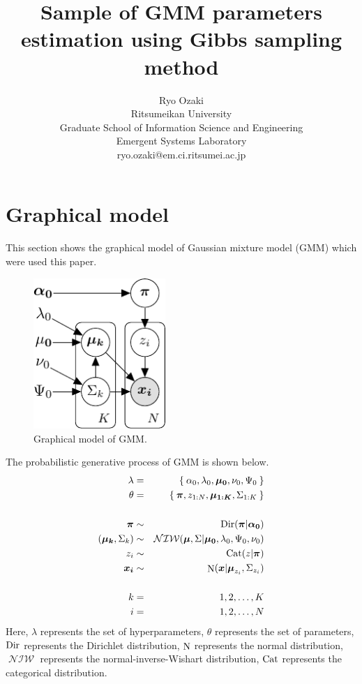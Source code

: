 \documentclass[a4paper]{article}
\title{Sample of GMM parameters estimation using Gibbs sampling method}
\author{Ryo Ozaki\\Ritsumeikan University\\Graduate School of Information Science and Engineering\\Emergent Systems Laboratory\\ryo.ozaki@em.ci.ritsumei.ac.jp}
\DeclareMathOperator{\Cat}{\rm Cat}
\DeclareMathOperator{\Dir}{\rm Dir}
\DeclareMathOperator{\N}{\rm N}
\DeclareMathOperator{\NIW}{\mathcal{NIW}}
\begin{document}
\maketitle
\section{Graphical model}
This section shows the graphical model of Gaussian mixture model (GMM) which were used this paper.
\begin{figure}[ht]
	\begin{center}
		\includegraphics[width=5cm]{fig/GMM_graphical_model.pdf}
		\caption{Graphical model of GMM.}
	\end{center}
\end{figure}

The probabilistic generative process of GMM is shown below.
\begin{eqnarray}
	\lambda &=& \Set{\alpha_0, \lambda_0, \boldsymbol{\mu_0}, \nu_0, \Psi_0}\\
	\theta &=& \Set{\boldsymbol{\pi}, z_{1:N}, \boldsymbol{\mu_{1:K}}, \Sigma_{1:K}}\\
	\nonumber \\
	\boldsymbol{\pi} &\sim& \Dir(\boldsymbol{\pi} | \boldsymbol{\alpha_0})\\
	(\boldsymbol{\mu_k}, \Sigma_k) &\sim& \NIW(\boldsymbol{\mu}, \Sigma | \boldsymbol{\mu_0}, \lambda_0, \Psi_0, \nu_0) \\
	z_i &\sim& \Cat(z | \boldsymbol{\pi}) \\
	\boldsymbol{x_i} &\sim& \N(\boldsymbol{x} | \boldsymbol{\mu}_{z_i}, \Sigma_{z_i})\\
	\nonumber \\
	k &=& 1, 2, \ldots, K\\
	i &=& 1, 2, \ldots, N
\end{eqnarray}
Here, $\lambda$ represents the set of hyperparameters, $\theta$ represents the set of parameters, $\Dir$ represents the Dirichlet distribution, $\N$ represents the normal distribution, $\NIW$ represents the normal-inverse-Wishart distribution, $\Cat$ represents the categorical distribution.
\end{document}
